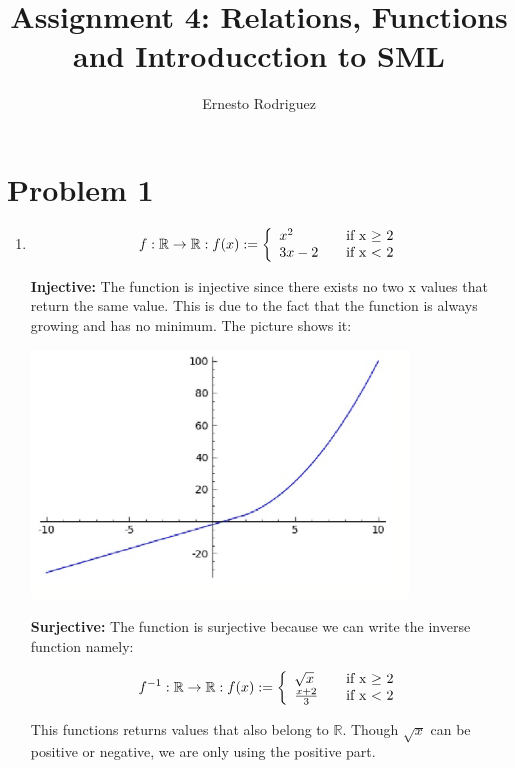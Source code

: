 \documentclass{article}
\title{Assignment 4: Relations, Functions and Introducction to SML}
\author{Ernesto Rodriguez}
\begin{document}
\maketitle

\section{Problem 1}

\begin{enumerate}

\item{
  
  \[
  f:\mathbb{R} \rightarrow \mathbb{R}:f(x):= \left\{ 
  \begin{array}{l l}
    x^2 & \quad \text{if x $\geq$ 2}\\
    3x-2 & \quad \text{if x $<$ 2}\\
  \end{array} \right.
  \]

  {\bf Injective: }The function is injective since there exists no two x values that return the same value. This is due to the fact that the function is always growing and has no minimum. The picture shows it:

  \includegraphics[width=100mm]{graph1.eps}

  {\bf Surjective: } The function is surjective because we can write the inverse function namely:

  \[
  f^{-1}:\mathbb{R} \rightarrow \mathbb{R}:f(x):= \left\{ 
  \begin{array}{l l}
    \sqrt{x} & \quad \text{if x $\geq$ 2}\\
    \frac{x+2}{3} & \quad \text{if x $<$ 2}\\
  \end{array} \right.
  \]

  This functions returns values that also belong to $\mathbb{R}$. Though $\sqrt{x}$ can be positive or negative, we are only using the positive part.

}
\end{enumerate}
\end{document}
